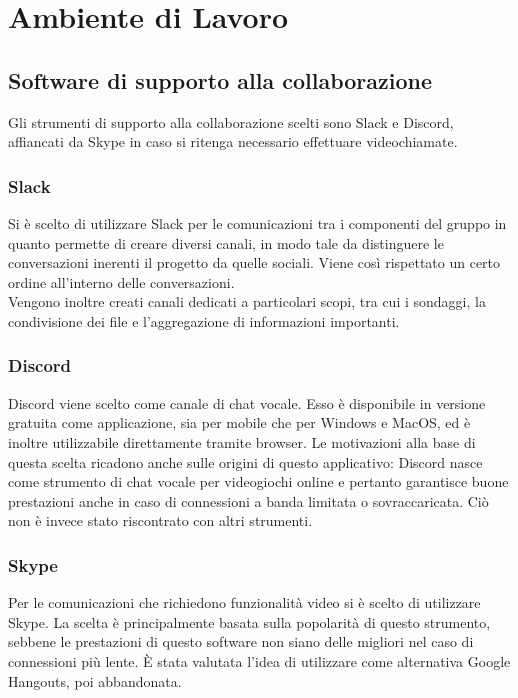 \section{Ambiente di Lavoro}

\subsection{Software di supporto alla collaborazione}
Gli strumenti di supporto alla collaborazione scelti sono Slack e Discord, affiancati da Skype in caso si ritenga necessario effettuare videochiamate.

\subsubsection{Slack}
Si è scelto di utilizzare Slack per le comunicazioni tra i componenti del gruppo in quanto permette di creare diversi canali, in modo tale da distinguere le conversazioni inerenti il progetto da quelle sociali. Viene così rispettato un certo ordine all'interno delle conversazioni.\\
Vengono inoltre creati canali dedicati a particolari scopi, tra cui i sondaggi, la condivisione dei file e l'aggregazione di informazioni importanti.

\subsubsection{Discord}
Discord viene scelto come canale di chat vocale. Esso è disponibile in versione gratuita come applicazione, sia per mobile che per Windows e MacOS, ed è inoltre utilizzabile direttamente tramite browser. Le motivazioni alla base di questa scelta ricadono anche sulle origini di questo applicativo: Discord nasce come strumento di chat vocale per videogiochi online e pertanto garantisce buone prestazioni anche in caso di connessioni a banda limitata o sovraccaricata. Ciò non è invece stato riscontrato con altri strumenti.

\subsubsection{Skype}
Per le comunicazioni che richiedono funzionalità video si è scelto di utilizzare Skype. La scelta è principalmente basata sulla popolarità di questo strumento, sebbene le prestazioni di questo software non siano delle migliori nel caso di connessioni più lente. È stata valutata l'idea di utilizzare come alternativa Google Hangouts, poi abbandonata.

